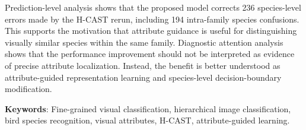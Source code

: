 \begin{small}
Prediction-level analysis shows that the proposed model corrects 236 species-level errors made by the H-CAST rerun, including 194 intra-family species confusions. This supports the motivation that attribute guidance is useful for distinguishing visually similar species within the same family. Diagnostic attention analysis shows that the performance improvement should not be interpreted as evidence of precise attribute localization. Instead, the benefit is better understood as attribute-guided representation learning and species-level decision-boundary modification.

\textbf{Keywords}: Fine-grained visual classification, hierarchical image classification, bird species recognition, visual attributes, H-CAST, attribute-guided learning.

\end{small}